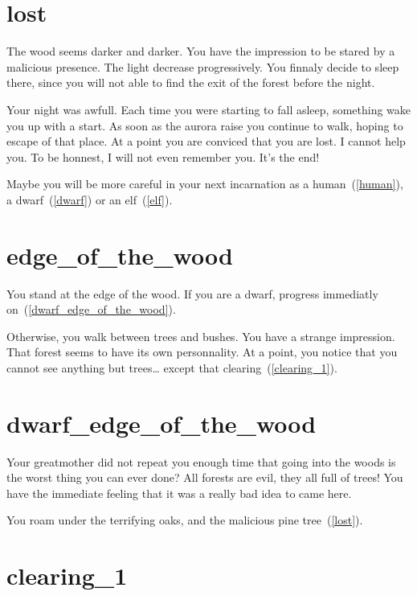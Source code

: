 \section{lost}

The wood seems darker and darker. You have the impression to be stared by a
malicious presence. The light decrease progressively. You finnaly decide to
sleep there, since you will not able to find the exit of the forest before the
night.

Your night was awfull. Each time you were starting to fall asleep, something
wake you up with a start. As soon as the aurora raise you continue to walk, hoping to
escape of that place. At a point you are conviced that you are lost. I cannot
help you. To be honnest, I will not even remember you. It's the end!

\medbreak

Maybe you will be more careful in your next incarnation as a
human~(\ref{human}), a dwarf~(\ref{dwarf}) or an elf~(\ref{elf}).

\section{edge_of_the_wood}

You stand at the edge of the wood. If you are a dwarf, progress immediatly
on~(\ref{dwarf_edge_of_the_wood}).

\medbreak

Otherwise, you walk between trees and bushes. You have a strange impression.
That forest seems to have its own personnality. At a point, you notice that you
cannot see anything but trees… except that clearing~(\ref{clearing_1}).

\section{dwarf_edge_of_the_wood}

Your greatmother did not repeat you enough time that going into the woods is
the worst thing you can ever done? All forests are evil, they all full of trees!
You have the immediate feeling that it was a really bad idea to came here.

You roam under the terrifying oaks, and the malicious pine tree~(\ref{lost}).

\section{clearing_1}

